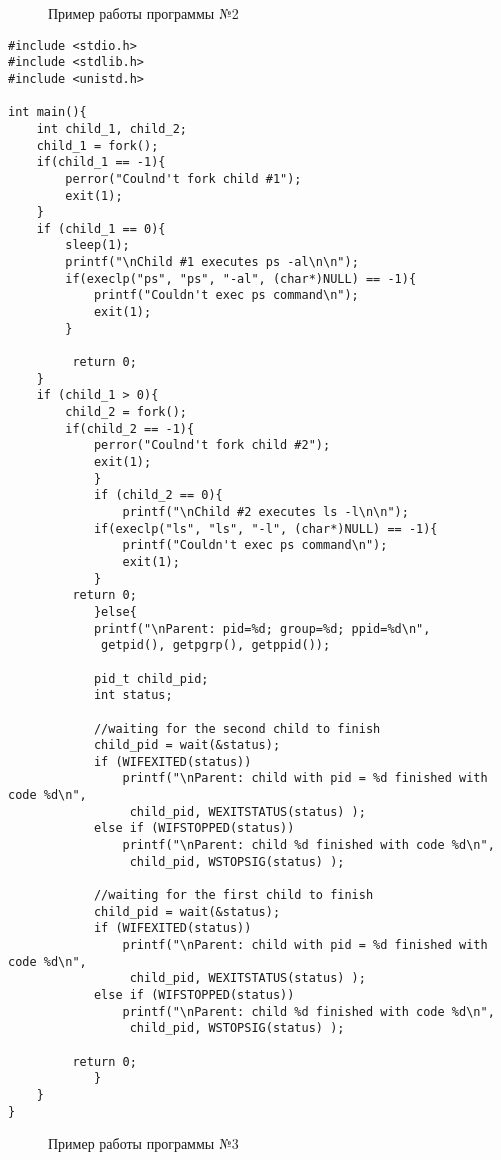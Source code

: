 \documentclass[12pt]{report}
\begin{document}
\begin{figure}[H]
	\caption{Пример работы программы №2}
	\label{ris:task2}
\end{figure}
\newpage
\begin{lstlisting}[label=three,caption =  Использование вызова exec(), style = CStyle]
#include <stdio.h>
#include <stdlib.h>
#include <unistd.h>

int main(){
	int child_1, child_2;
	child_1 = fork();
	if(child_1 == -1){
		perror("Coulnd't fork child #1");
		exit(1);
	}
	if (child_1 == 0){
		sleep(1);
		printf("\nChild #1 executes ps -al\n\n");
		if(execlp("ps", "ps", "-al", (char*)NULL) == -1){
			printf("Couldn't exec ps command\n");
			exit(1);
		}
		 
		 return 0;
	}
	if (child_1 > 0){
		child_2 = fork();
		if(child_2 == -1){
			perror("Coulnd't fork child #2");
			exit(1);
	        }
	        if (child_2 == 0){
	        	printf("\nChild #2 executes ls -l\n\n");
		 	if(execlp("ls", "ls", "-l", (char*)NULL) == -1){
				printf("Couldn't exec ps command\n");
				exit(1);
			}
		 return 0;
	        }else{
	       	printf("\nParent: pid=%d; group=%d; ppid=%d\n",
		  	 getpid(), getpgrp(), getppid());
		  	 
		  	pid_t child_pid;
		 	int status;
		 	
		 	//waiting for the second child to finish
		 	child_pid = wait(&status);
		 	if (WIFEXITED(status))
		 		printf("\nParent: child with pid = %d finished with code %d\n",
		 		 child_pid, WEXITSTATUS(status) );
		 	else if (WIFSTOPPED(status))
		 		printf("\nParent: child %d finished with code %d\n",
		 		 child_pid, WSTOPSIG(status) );
		 		 
		 	//waiting for the first child to finish	 
		 	child_pid = wait(&status);
		 	if (WIFEXITED(status))
		 		printf("\nParent: child with pid = %d finished with code %d\n",
		 		 child_pid, WEXITSTATUS(status) );
		 	else if (WIFSTOPPED(status))
		 		printf("\nParent: child %d finished with code %d\n",
		 		 child_pid, WSTOPSIG(status) );
		 
		 return 0;
	        }
	}
}
\end{lstlisting}
\begin{figure}[H]
	\caption{Пример работы программы №3}
	\label{ris:task3}
\end{figure}
\newpage
\end{document}
